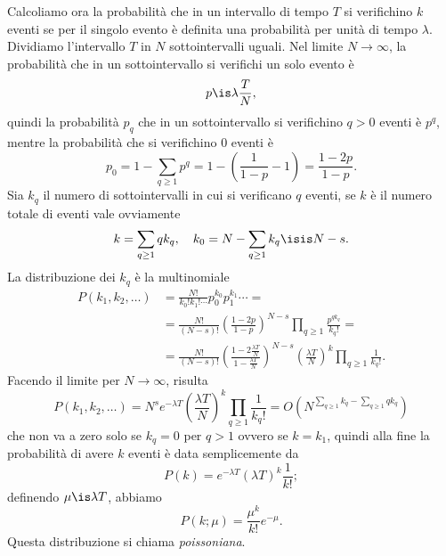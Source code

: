 Calcoliamo ora la probabilità che in un intervallo di tempo $T$ si verifichino $k$ eventi se per il singolo evento è definita una probabilità per unità di tempo $\lambda$.
Dividiamo l'intervallo $T$ in $N$ sottointervalli uguali.
Nel limite $N\to\infty$, la probabilità che in un sottointervallo si verifichi un solo evento è
\begin{equation*}
	p \is \lambda \frac TN,
\end{equation*}
quindi la probabilità $p_q$ che in un sottointervallo si verifichino $q>0$ eventi è $p^q$,
mentre la probabilità che si verifichino 0 eventi è
\begin{equation*}
	p_0 = 1 - \sum_{q\ge1} p^q = 1 - \left(\frac1{1-p} - 1\right) = \frac{1-2p}{1-p}.
\end{equation*}
Sia $k_q$ il numero di sottointervalli in cui si verificano $q$ eventi,
se $k$ è il numero totale di eventi vale ovviamente
\begin{equation*}
	k = \sum_{q\ge1} q k_q, \quad k_0 = N - \sum_{q\ge 1} k_q \isis N - s.
\end{equation*}
La distribuzione dei $k_q$ è la multinomiale
\begin{align*}
	P(k_1,k_2,\dotsc)
	&= \frac{N!}{k_0!k_1!\dotsm} p_0^{k_0} p_1^{k_1} \dotsm = \\
	&= \frac{N!}{(N - s)!} \left(\frac{1-2p}{1-p}\right)^{N-s} \prod_{q\ge1} \frac{p^{qk_q}}{k_q!} = \\
	&= \frac{N!}{(N - s)!} \left(\frac{1-2\frac{\lambda T}{N}}{1-\frac{\lambda T}{N}}\right)^{N-s} \left(\frac{\lambda T}{N}\right)^k \prod_{q\ge1} \frac1{k_q!}.
\end{align*}
Facendo il limite per $N\to\infty$, risulta
\begin{equation*}
	P(k_1,k_2,\dotsc)
	= N^s e^{-\lambda T} \left(\frac{\lambda T}{N}\right)^k \prod_{q\ge1} \frac1{k_q!}
	= O\left(N^{\sum_{q\ge1} k_q - \sum_{q\ge1} qk_q}\right)
\end{equation*}
che non va a zero solo se $k_q=0$ per $q > 1$ ovvero se $k=k_1$,
quindi alla fine la probabilità di avere $k$ eventi è data semplicemente da
\begin{equation*}
	P(k) = e^{-\lambda T} (\lambda T)^k \frac1{k!};
\end{equation*}
definendo $\mu\is\lambda T$, abbiamo
\begin{equation*}
	P(k;\mu) = \frac{\mu^k}{k!} e^{-\mu}.
\end{equation*}
Questa distribuzione si chiama \emph{poissoniana}.

